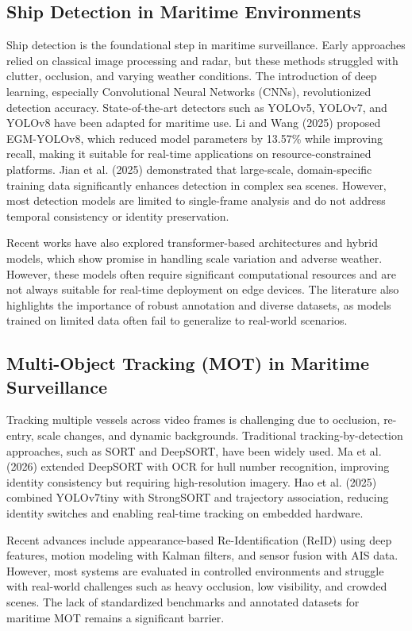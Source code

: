 \subsection{Ship Detection in Maritime Environments}
Ship detection is the foundational step in maritime surveillance. Early approaches relied on classical image processing and radar, but these methods struggled with clutter, occlusion, and varying weather conditions. The introduction of deep learning, especially Convolutional Neural Networks (CNNs), revolutionized detection accuracy. State-of-the-art detectors such as YOLOv5, YOLOv7, and YOLOv8 have been adapted for maritime use. Li and Wang (2025) proposed EGM-YOLOv8, which reduced model parameters by 13.57\% while improving recall, making it suitable for real-time applications on resource-constrained platforms. Jian et al. (2025) demonstrated that large-scale, domain-specific training data significantly enhances detection in complex sea scenes. However, most detection models are limited to single-frame analysis and do not address temporal consistency or identity preservation.

Recent works have also explored transformer-based architectures and hybrid models, which show promise in handling scale variation and adverse weather. However, these models often require significant computational resources and are not always suitable for real-time deployment on edge devices. The literature also highlights the importance of robust annotation and diverse datasets, as models trained on limited data often fail to generalize to real-world scenarios.

\subsection{Multi-Object Tracking (MOT) in Maritime Surveillance}
Tracking multiple vessels across video frames is challenging due to occlusion, re-entry, scale changes, and dynamic backgrounds. Traditional tracking-by-detection approaches, such as SORT and DeepSORT, have been widely used. Ma et al. (2026) extended DeepSORT with OCR for hull number recognition, improving identity consistency but requiring high-resolution imagery. Hao et al. (2025) combined YOLOv7tiny with StrongSORT and trajectory association, reducing identity switches and enabling real-time tracking on embedded hardware.

Recent advances include appearance-based Re-Identification (ReID) using deep features, motion modeling with Kalman filters, and sensor fusion with AIS data. However, most systems are evaluated in controlled environments and struggle with real-world challenges such as heavy occlusion, low visibility, and crowded scenes. The lack of standardized benchmarks and annotated datasets for maritime MOT remains a significant barrier.

